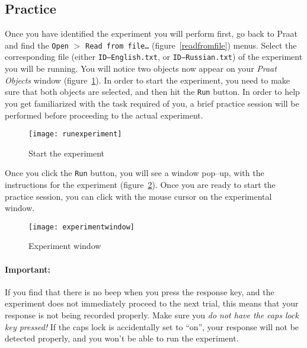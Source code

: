 \documentclass{article}
\newcommand{\soft}[1]{\textsf{#1}}
\newcommand{\filefmat}[1]{\texttt{#1}}
\newcommand{\softmenu}[1]{\texttt{#1}}
\newcommand{\Praat}{\soft{Praat}}
\begin{document}

\subsection{Practice}

Once you have identified the experiment you will perform first, go back to \Praat{} and find the \softmenu{Open} $>$ \softmenu{Read from file\ldots} (figure~\ref{readfromfile}) menus. Select the corresponding file (either \filefmat{ID--English.txt}, or \filefmat{ID--Russian.txt}) of the experiment you will be running. You will notice two objects now appear on your \emph{\Praat{} Objects} window (figure~\ref{runexperiment}). In order to start the experiment, you need to make sure that both objects are selected, and then hit the \softmenu{Run} button. In order to help you get familiarized with the task required of you, a brief practice session will be performed before proceeding to the actual experiment.

\begin{figure}[!tbp]
\caption{Start the experiment}
\label{runexperiment}
	\begin{center}
		\texttt{[image: runexperiment]}
	\end{center}
\end{figure}

Once you click the \softmenu{Run} button, you will see a window pop--up, with the instructions for the experiment (figure~\ref{experimentwindow}). Once you are ready to start the practice session, you can click with the mouse cursor on the experimental window.

\begin{figure}[!tbp]
\caption{Experiment window}
\label{experimentwindow}
	\begin{center}
		\texttt{[image: experimentwindow]}
	\end{center}
\end{figure}

\paragraph{Important:} If you find that there is no beep when you press the response key, and the experiment does not immediately proceed to the next trial, this means that your response is not being recorded properly. Make sure you \emph{do not have the caps lock key pressed!} If the caps lock is accidentally set to ``on'', your response will not be detected properly, and you won't be able to run the experiment.
\end{document}
